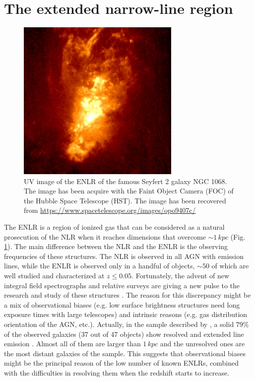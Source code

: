 \documentclass[../main.tex]{subfiles}
\begin{document}
\section{The extended narrow-line region}
\label{sec:ENLR}

\begin{figure}
\centering
\includegraphics[width=0.7\textwidth]{./images/opo9407c.jpg} 
\caption[]{UV image of the ENLR of the famous Seyfert 2 galaxy NGC 1068. The image has been acquire with the Faint Object Camera (FOC) of the Hubble Space Telescope (HST). The image has been recovered from \url{https://www.spacetelescope.org/images/opo9407c/}}
\label{fig:NGC1068}
\end{figure}

The ENLR is a region of ionized gas that can be considered as a natural prosecution of the NLR when it reaches dimensions that overcome $\sim 1\,\si{kpc}$ (Fig.\,\ref{fig:NGC1068}).
The main difference between the NLR and the ENLR is the observing frequencies of these structures.
The NLR is observed in all AGN with emission lines, while the ENLR is observed only in a handful of objects, $\sim50$ of which are well studied and characterized at $z\le0.05$.
Fortunately, the advent of new integral field spectrographs and relative surveys \citep[e.g. MaNGA,][]{Bundy15} are giving a new pulse to the research and study of these structures \citep{Husemann14,He18}.
The reason for this discrepancy might be a mix of observational biases (e.g. low surface brightness structures need long exposure times with large telescopes) and intrinsic reasons (e.g. gas distribution orientation of the AGN, etc.).
Actually, in the sample described by \citet{Mulchaey96a}, a solid $79\%$ of the observed galaxies (37 out of 47 objects) show resolved and extended line emission \citep{Mulchaey96b}. 
Almost all of them are larger than $1\,\si{kpc}$ and the unresolved ones are the most distant galaxies of the sample.
This suggests that observational biases might be the principal reason of the low number of known ENLRs, combined with the difficulties in resolving them when the redshift starts to increase. 
\end{document}

